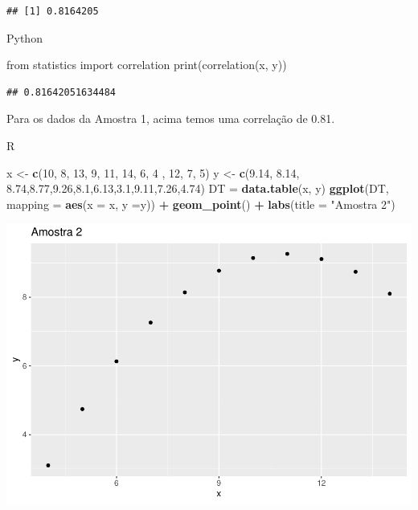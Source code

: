 \documentclass[
]{book}
\newenvironment{Shaded}{\begin{snugshade}}{\end{snugshade}}
\newcommand{\AttributeTok}[1]{\textcolor[rgb]{0.13,0.29,0.53}{#1}}
\newcommand{\BuiltInTok}[1]{#1}
\newcommand{\DecValTok}[1]{\textcolor[rgb]{0.00,0.00,0.81}{#1}}
\newcommand{\FloatTok}[1]{\textcolor[rgb]{0.00,0.00,0.81}{#1}}
\newcommand{\FunctionTok}[1]{\textcolor[rgb]{0.13,0.29,0.53}{\textbf{#1}}}
\newcommand{\ImportTok}[1]{#1}
\newcommand{\NormalTok}[1]{#1}
\newcommand{\OtherTok}[1]{\textcolor[rgb]{0.56,0.35,0.01}{#1}}
\newcommand{\SpecialCharTok}[1]{\textcolor[rgb]{0.81,0.36,0.00}{\textbf{#1}}}
\newcommand{\StringTok}[1]{\textcolor[rgb]{0.31,0.60,0.02}{#1}}
\begin{document}
\begin{verbatim}
## [1] 0.8164205
\end{verbatim}

Python

\begin{Shaded}
\begin{Highlighting}[]
\ImportTok{from}\NormalTok{ statistics }\ImportTok{import}\NormalTok{ correlation}
\BuiltInTok{print}\NormalTok{(correlation(x, y))}
\end{Highlighting}
\end{Shaded}

\begin{verbatim}
## 0.81642051634484
\end{verbatim}

Para os dados da Amostra 1, acima temos uma correlação de 0.81.

R

\begin{Shaded}
\begin{Highlighting}[]
\NormalTok{x }\OtherTok{\textless{}{-}} \FunctionTok{c}\NormalTok{(}\DecValTok{10}\NormalTok{, }\DecValTok{8}\NormalTok{, }\DecValTok{13}\NormalTok{, }\DecValTok{9}\NormalTok{, }\DecValTok{11}\NormalTok{, }\DecValTok{14}\NormalTok{, }\DecValTok{6}\NormalTok{, }\DecValTok{4}\NormalTok{ , }\DecValTok{12}\NormalTok{, }\DecValTok{7}\NormalTok{, }\DecValTok{5}\NormalTok{)}
\NormalTok{y }\OtherTok{\textless{}{-}} \FunctionTok{c}\NormalTok{(}\FloatTok{9.14}\NormalTok{, }\FloatTok{8.14}\NormalTok{, }\FloatTok{8.74}\NormalTok{,}\FloatTok{8.77}\NormalTok{,}\FloatTok{9.26}\NormalTok{,}\FloatTok{8.1}\NormalTok{,}\FloatTok{6.13}\NormalTok{,}\FloatTok{3.1}\NormalTok{,}\FloatTok{9.11}\NormalTok{,}\FloatTok{7.26}\NormalTok{,}\FloatTok{4.74}\NormalTok{)}
\NormalTok{DT }\OtherTok{=} \FunctionTok{data.table}\NormalTok{(x, y)}
\FunctionTok{ggplot}\NormalTok{(DT, }\AttributeTok{mapping =} \FunctionTok{aes}\NormalTok{(}\AttributeTok{x =}\NormalTok{ x, }\AttributeTok{y =}\NormalTok{y)) }\SpecialCharTok{+}
  \FunctionTok{geom\_point}\NormalTok{() }\SpecialCharTok{+}
  \FunctionTok{labs}\NormalTok{(}\AttributeTok{title =} \StringTok{"Amostra 2"}\NormalTok{)}
\end{Highlighting}
\end{Shaded}

\includegraphics{_main_files/figure-latex/unnamed-chunk-11-1.pdf}
\end{document}
